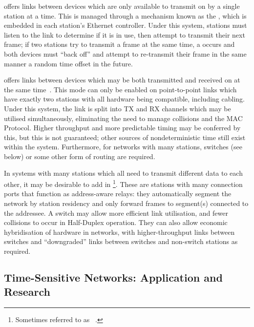 \begin{description}
    \item{}\label{def:halfduplex} offers links between devices which are only available to transmit on by a single station at a time.
        This is managed through a mechanism known as the , which is embedded in each station's Ethernet controller.
        Under this system, stations must listen to the link to determine if it is in use, then attempt to transmit their next frame; if two stations try to transmit a frame at the same time, a  occurs and both devices must ``back off'' and attempt to re-transmit their frame in the same manner a random time offset in the future.
    \item{}\label{def:fullduplex} offers links between devices which may be both transmitted and received on at the same time~\cite{spurgeonEthernetDefinitiveGuide2000}.
        This mode can only be enabled on point-to-point links which have exactly two stations with all hardware being compatible, including cabling.
        Under this system, the link is split into TX and RX channels which may be utilised simultaneously, eliminating the need to manage collisions and the MAC Protocol.
        Higher throughput and more predictable timing may be conferred by this, but this is not guaranteed; other sources of nondeterministic time still exist within the system.
        Furthermore, for networks with many stations, switches (see below) or some other form of routing are required.
\end{description}

In systems with many stations which all need to transmit different data to each other, it may be desirable to add in \footnote{Sometimes referred to as ~\cite{spurgeonEthernetDefinitiveGuide2000}.}.
These are stations with many connection ports that function as address-aware relays: they automatically segment the network by station residency and only forward frames to segment(s) connected to the addressee\cite{spurgeonEthernetDefinitiveGuide2000}.
A switch may allow more efficient link utilisation, and fewer collisions to occur in Half-Duplex operation.
They can also allow economic hybridisation of hardware in networks, with higher-throughput links between switches and ``downgraded'' links between switches and non-switch stations as required.

\subsection{Time-Sensitive Networks: Application and Research}

